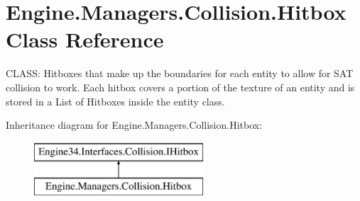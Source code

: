 \hypertarget{a00506}{}\section{Engine.\+Managers.\+Collision.\+Hitbox Class Reference}
\label{a00506}


C\+L\+A\+SS\+: Hitboxes that make up the boundaries for each entity to allow for S\+AT collision to work. Each hitbox covers a portion of the texture of an entity and is stored in a List of Hitboxes inside the entity class.  


Inheritance diagram for Engine.\+Managers.\+Collision.\+Hitbox\+:\begin{figure}[H]
\begin{center}
\leavevmode
\includegraphics[height=2.000000cm]{d4/d1f/a00506}
\end{center}
\end{figure}
